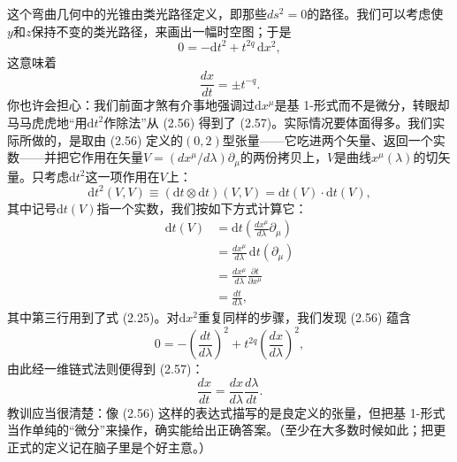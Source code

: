 这个弯曲几何中的光锥由类光路径定义，即那些$ds^2=0$的路径。我们可以考虑使
$y$和$z$保持不变的类光路径，来画出一幅时空图；于是
\begin{equation*}
0=-\mathrm{d}t^2+t^{2q}\,\mathrm{d}x^2,
\tag{2.56}
\end{equation*}
这意味着
\begin{equation*}
\frac{dx}{dt}=\pm t^{-q}.
\tag{2.57}
\end{equation*}
你也许会担心：我们前面才煞有介事地强调过$\mathrm{d}x^\mu$是基 1-形式而不是微分，转眼却马马虎虎地“用$\mathrm{d}t^2$作除法”从 (2.56) 得到了 (2.57)。实际情况要体面得多。我们实际所做的，是取由 (2.56) 定义的$(0,2)$型张量——它吃进两个矢量、返回一个实数——并把它作用在矢量$V=(dx^\mu/d\lambda)\partial_\mu$的两份拷贝上，$V$是曲线$x^\mu(\lambda)$的切矢量。只考虑$\mathrm{d}t^2$这一项作用在$V$上：
\begin{equation*}
\mathrm{d}t^2(V,V)\equiv(\mathrm{d}t\otimes\mathrm{d}t)(V,V)=\mathrm{d}t(V)\cdot\mathrm{d}t(V),
\tag{2.58}
\end{equation*}
其中记号$\mathrm{d}t(V)$指一个实数，我们按如下方式计算它：
\begin{align*}
\mathrm{d}t(V)&=\mathrm{d}t\left(\frac{dx^\mu}{d\lambda}\partial_\mu\right)\\
&=\frac{dx^\mu}{d\lambda}\,\mathrm{d}t\left(\partial_\mu\right)\\
&=\frac{dx^\mu}{d\lambda}\frac{\partial t}{\partial x^\mu}\\
&=\frac{dt}{d\lambda},
\tag{2.59}
\end{align*}
其中第三行用到了式 (2.25)。对$\mathrm{d}x^2$重复同样的步骤，我们发现 (2.56) 蕴含
\begin{equation*}
0=-\left(\frac{dt}{d\lambda}\right)^2+t^{2q}\left(\frac{dx}{d\lambda}\right)^2,
\tag{2.60}
\end{equation*}
由此经一维链式法则便得到 (2.57)：
\begin{equation*}
\frac{dx}{dt}=\frac{dx}{d\lambda}\frac{d\lambda}{dt}.
\tag{2.61}
\end{equation*}
教训应当很清楚：像 (2.56) 这样的表达式描写的是良定义的张量，但把基 1-形式当作单纯的“微分”来操作，确实能给出正确答案。（至少在大多数时候如此；把更正式的定义记在脑子里是个好主意。）

